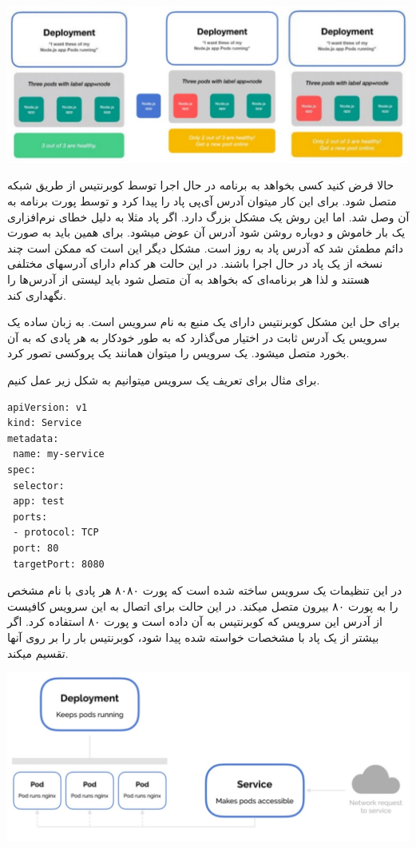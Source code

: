 \documentclass[a4]{report}
\begin{document}
\includegraphics[scale=0.5]{fig/deploy}

حالا فرض کنید کسی بخواهد به برنامه در حال اجرا توسط کوبرنتیس از طریق شبکه متصل شود. برای این کار
میتوان آدرس آی‌پی پاد را پیدا کرد و توسط پورت برنامه به آن وصل شد. اما این روش یک مشکل بزرگ دارد. اگر پاد مثلا به دلیل خطای نرم‌افزاری یک بار خاموش و دوباره روشن شود آدرس آن عوض میشود. برای
همین باید به صورت دائم مطمئن شد که آدرس پاد به روز است. مشکل دیگر این است که ممکن است چند
نسخه از یک پاد در حال اجرا باشند. در این حالت هر کدام دارای آدرسهای مختلفی هستند و لذا هر برنامه‌ای
که بخواهد به آن متصل شود باید لیستی از آدرس‌ها را نگهداری کند.

برای حل این مشکل کوبرنتیس دارای یک منبع به نام سرویس است. به زبان ساده یک سرویس یک آدرس ثابت در اختیار می‌گذارد که به طور خودکار به هر پادی که به آن بخورد متصل میشود. یک سرویس را میتوان همانند یک پروکسی
 تصور کرد.

برای مثال برای تعریف یک سرویس میتوانیم به شکل زیر عمل کنیم.

\begin{latin}
\begin{verbatim}
apiVersion: v1
kind: Service
metadata:
 name: my-service
spec:
 selector:
 app: test
 ports:
 - protocol: TCP
 port: 80
 targetPort: 8080
\end{verbatim}
\end{latin}

در این تنظیمات یک سرویس ساخته شده است که پورت ۸۰۸۰ هر پادی با نام مشخص را به پورت ۸۰
بیرون متصل میکند. در این حالت برای اتصال به این سرویس کافیست از آدرس این سرویس که کوبرنتیس
به آن داده است و پورت ۸۰ استفاده کرد. اگر بیشتر از یک پاد با مشخصات خواسته شده پیدا شود، کوبرنتیس
بار را بر روی آنها تقسیم میکند.

\includegraphics[scale=0.5]{fig/service}
\end{document}
